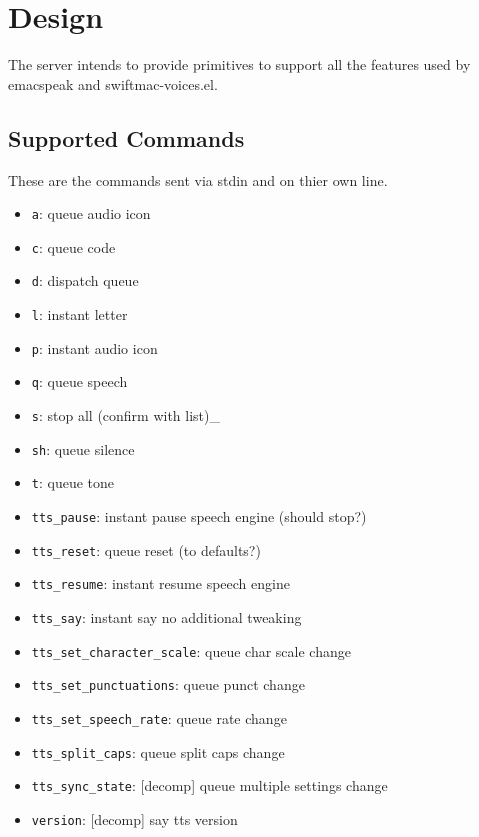 \documentclass[11pt]{article}
\author{Robert Melton}
\date{\today}
\title{}
\begin{document}
\tableofcontents

\section{Design}
\label{sec:org5cf9dd6}

The server intends to provide primitives to support all the features used by
emacspeak and swiftmac-voices.el.


\subsection{Supported Commands}
\label{sec:orgc5ff25e}

These are the commands sent via stdin and on thier own line.

\begin{itemize}
\item \texttt{a}: queue audio icon
\item \texttt{c}: queue code
\item \texttt{d}: dispatch queue
\item \texttt{l}: instant letter
\item \texttt{p}: instant audio icon
\item \texttt{q}: queue speech
\item \texttt{s}: stop all (confirm with list)\_
\item \texttt{sh}: queue silence
\item \texttt{t}: queue tone
\item \texttt{tts\_pause}: instant pause speech engine (should stop?)
\item \texttt{tts\_reset}: queue reset (to defaults?)
\item \texttt{tts\_resume}: instant resume speech engine
\item \texttt{tts\_say}: instant say no additional tweaking
\item \texttt{tts\_set\_character\_scale}: queue char scale change
\item \texttt{tts\_set\_punctuations}: queue punct change
\item \texttt{tts\_set\_speech\_rate}: queue rate change
\item \texttt{tts\_split\_caps}: queue split caps change
\item \texttt{tts\_sync\_state}: [decomp] queue multiple settings change
\item \texttt{version}: [decomp] say tts version
\end{itemize}
\end{document}
